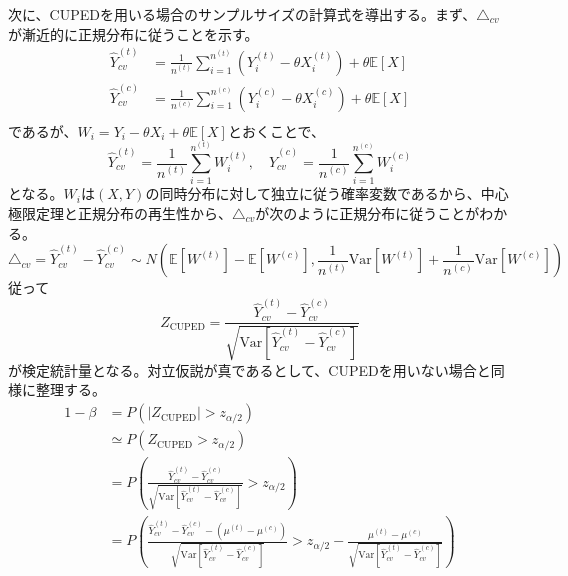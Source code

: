 次に、CUPEDを用いる場合のサンプルサイズの計算式を導出する。まず、$\triangle_{cv}$が漸近的に正規分布に従うことを示す。
\begin{align}
    \hat{Y}_{cv}^{(t)} & = \frac{1}{n^{(t)}}\sum_{i = 1}^{n^{(t)}}(Y_{i}^{(t)} - \theta X_{i}^{(t)}) + \theta \mathbb{E}[X] \\
    \hat{Y}_{cv}^{(c)} & = \frac{1}{n^{(c)}}\sum_{i = 1}^{n^{(c)}}(Y_{i}^{(c)} - \theta X_{i}^{(c)}) + \theta \mathbb{E}[X] \\
\end{align}
であるが、$W_{i} = Y_{i} - \theta X_{i} + \theta \mathbb{E}[X]$とおくことで、
\begin{equation}
    \hat{Y}_{cv}^{(t)} = \frac{1}{n^{(t)}} \sum_{i = 1}^{n^{(t)}} W_{i}^{(t)},\quad \hat{Y}_{cv}^{(c)} = \frac{1}{n^{(c)}} \sum_{i = 1}^{n^{(c)}} W_{i}^{(c)}
\end{equation}
となる。$W_{i}$は$(X, Y)$の同時分布に対して独立に従う確率変数であるから、中心極限定理と正規分布の再生性から、$\triangle_{cv}$が次のように正規分布に従うことがわかる。
\begin{equation}
    \triangle_{cv} = \hat{Y}_{cv}^{(t)} - \hat{Y}_{cv}^{(c)} \sim N\left(\mathbb{E}[W^{(t)}] - \mathbb{E}[W^{(c)}], \frac{1}{n^{(t)}}\text{Var}[W^{(t)}] + \frac{1}{n^{(c)}}\text{Var}[W^{(c)}]\right)
\end{equation}
従って
\begin{equation}
    Z_{\text{CUPED}} = \frac{\hat{Y}_{cv}^{(t)} - \hat{Y}_{cv}^{(c)}}{\sqrt{\text{Var}[\hat{Y}_{cv}^{(t)} - \hat{Y}_{cv}^{(c)}]}}
\end{equation}
が検定統計量となる。対立仮説が真であるとして、CUPEDを用いない場合と同様に整理する。
\begin{align}
    1 - \beta & = P(|Z_{\text{CUPED}}| > z_{\alpha/2})                                                                                                                                                                                                                         \\
              & \simeq P(Z_{\text{CUPED}} > z_{\alpha / 2})                                                                                                                                                                                                                    \\
              & = P\left(\frac{\hat{Y}_{cv}^{(t)} - \hat{Y}_{cv}^{(c)}}{\sqrt{\text{Var}[\hat{Y}_{cv}^{(t)} - \hat{Y}_{cv}^{(c)}]}} > z_{\alpha/2}\right)                                                                                                                      \\
              & = P\left(\frac{\hat{Y}_{cv}^{(t)} - \hat{Y}_{cv}^{(c)} - (\mu^{(t)} - \mu^{(c)})}{\sqrt{\text{Var}[\hat{Y}_{cv}^{(t)} - \hat{Y}_{cv}^{(c)}]}} > z_{\alpha/2} - \frac{\mu^{(t)} - \mu^{(c)}}{\sqrt{\text{Var}[\hat{Y}_{cv}^{(t)} - \hat{Y}_{cv}^{(c)}]}}\right) \\
\end{align}
